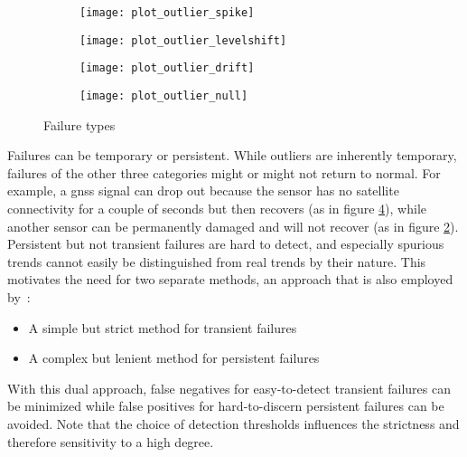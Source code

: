 \begin{figure}[t]
	\begin{subfigure}[c]{0.5\textwidth}
		\centering
		\texttt{[image: plot\_outlier\_spike]}%
		\label{fig:failure-type-outlier}
	\end{subfigure}
	\begin{subfigure}[c]{0.5\textwidth}
		\centering
		\texttt{[image: plot\_outlier\_levelshift]}%
		\label{fig:failure-type-levelshift}
	\end{subfigure}
	\begin{subfigure}[c]{0.5\textwidth}
		\centering
		\texttt{[image: plot\_outlier\_drift]}%
		\label{fig:failure-type-drift}
	\end{subfigure}
	\begin{subfigure}[c]{0.5\textwidth}
		\centering
		\texttt{[image: plot\_outlier\_null]}%
		\label{fig:failure-type-null}
	\end{subfigure}
	\caption{Failure types}
	\label{fig:failure-types}
\end{figure}

Failures can be temporary or persistent. While outliers are inherently temporary, failures of the other three categories might or might not return to normal. For example, a \gls{gnss} signal can drop out because the sensor has no satellite connectivity for a couple of seconds but then recovers (as in figure \ref{fig:failure-type-null}), while another sensor can be permanently damaged and will not recover (as in figure \ref{fig:failure-type-levelshift}). Persistent but not transient failures are hard to detect, and especially spurious trends cannot easily be distinguished from real trends by their nature. This motivates the need for two separate methods, an approach that is also employed by~\cite{Kabzan.2019}:
\begin{itemize}
\item A simple but strict method for transient failures
\item A complex but lenient method for persistent failures
\end{itemize}
With this dual approach, false negatives for easy-to-detect transient failures can be minimized while false positives for hard-to-discern persistent failures can be avoided. Note that the choice of detection thresholds influences the strictness and therefore sensitivity to a high degree.


